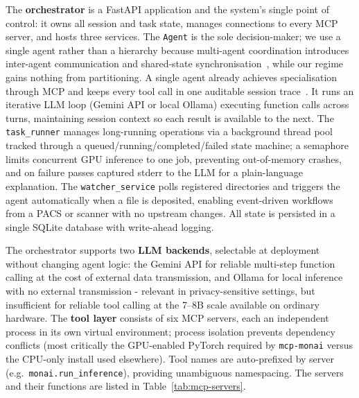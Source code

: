 \documentclass[conference]{IEEEtran}
\begin{document}
The \textbf{orchestrator} is a FastAPI application and the system's single point of control: it owns all session and task state, manages connections to every MCP server, and hosts three services. The \texttt{Agent} is the sole decision-maker; we use a single agent rather than a hierarchy because multi-agent coordination introduces inter-agent communication and shared-state synchronisation~\cite{guo2024llmma}, while our regime gains nothing from partitioning. A single agent already achieves specialisation through MCP and keeps every tool call in one auditable session trace~\cite{collaco2026scoping}. It runs an iterative LLM loop (Gemini API or local Ollama) executing function calls across turns, maintaining session context so each result is available to the next. The \texttt{task\_runner} manages long-running operations via a background thread pool tracked through a queued/running/completed/failed state machine; a semaphore limits concurrent GPU inference to one job, preventing out-of-memory crashes, and on failure passes captured stderr to the LLM for a plain-language explanation. The \texttt{watcher\_service} polls registered directories and triggers the agent automatically when a file is deposited, enabling event-driven workflows from a PACS or scanner with no upstream changes. All state is persisted in a single SQLite database with write-ahead logging.

The orchestrator supports two \textbf{LLM backends}, selectable at deployment without changing agent logic: the Gemini API for reliable multi-step function calling at the cost of external data transmission, and Ollama for local inference with no external transmission - relevant in privacy-sensitive settings, but insufficient for reliable tool calling at the 7--8B scale available on ordinary hardware. The \textbf{tool layer} consists of six MCP servers, each an independent process in its own virtual environment; process isolation prevents dependency conflicts (most critically the GPU-enabled PyTorch required by \texttt{mcp-monai} versus the CPU-only install used elsewhere). Tool names are auto-prefixed by server (e.g.\ \texttt{monai.run\_inference}), providing unambiguous namespacing. The servers and their functions are listed in Table~\ref{tab:mcp-servers}.
\end{document}
